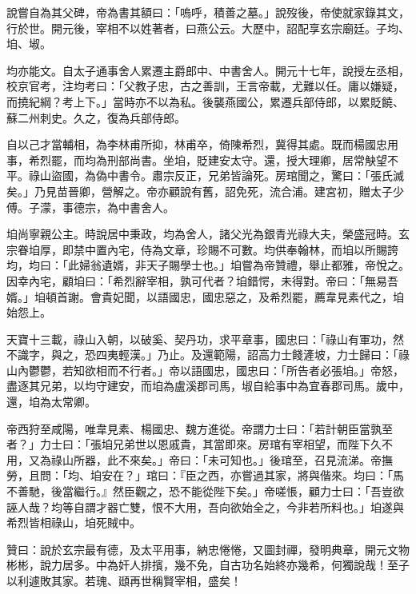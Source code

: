 \begin{pinyinscope}
 說嘗自為其父碑，帝為書其額曰：「嗚呼，積善之墓。」說歿後，帝使就家錄其文，行於世。開元後，宰相不以姓著者，曰燕公云。大歷中，詔配享玄宗廟廷。子均、垍、埱。



 均亦能文。自太子通事舍人累遷主爵郎中、中書舍人。開元十七年，說授左丞相，校京官考，注均考曰：「父教子忠，古之善訓，王言帝載，尤難以任。庸以嫌疑，而撓紀綱？考上下。」當時亦不以為私。後襲燕國公，累遷兵部侍郎，以累貶饒、蘇二州刺史。久之，復為兵部侍郎。



 自以己才當輔相，為李林甫所抑，林甫卒，倚陳希烈，冀得其處。既而楊國忠用事，希烈罷，而均為刑部尚書。坐垍，貶建安太守。還，授大理卿，居常觖望不平。祿山盜國，為偽中書令。肅宗反正，兄弟皆論死。房琯聞之，驚曰：「張氏滅矣。」乃見苗晉卿，營解之。帝亦顧說有舊，詔免死，流合浦。建宮初，贈太子少傅。子濛，事德宗，為中書舍人。



 垍尚寧親公主。時說居中秉政，均為舍人，諸父光為銀青光祿大夫，榮盛冠時。玄宗眷垍厚，即禁中置內宅，侍為文章，珍賜不可數。均供奉翰林，而垍以所賜誇均，均曰：「此婦翁遺婿，非天子賜學士也。」垍嘗為帝贊禮，舉止都雅，帝悅之。因幸內宅，顧垍曰：「希烈辭宰相，孰可代者？垍錯愕，未得對。帝曰：「無易吾婿。」垍頓首謝。會貴妃聞，以語國忠，國忠惡之，及希烈罷，薦韋見素代之，垍始怨上。



 天寶十三載，祿山入朝，以破奚、契丹功，求平章事，國忠曰：「祿山有軍功，然不識字，與之，恐四夷輕漢。」乃止。及還範陽，詔高力士餞滻坡，力士歸曰：「祿山內鬱鬱，若知欲相而不行者。」帝以語國忠，國忠曰：「所告者必張垍。」帝怒，盡逐其兄弟，以均守建安，而垍為盧溪郡司馬，埱自給事中為宜春郡司馬。歲中，還，垍為太常卿。



 帝西狩至咸陽，唯韋見素、楊國忠、魏方進從。帝謂力士曰：「若計朝臣當孰至者？」力士曰：「張垍兄弟世以恩戚貴，其當即來。房琯有宰相望，而陛下久不用，又為祿山所器，此不來矣。」帝曰：「未可知也。」後琯至，召見流涕。帝撫勞，且問：「均、垍安在？」琯曰：『臣之西，亦嘗過其家，將與偕來。均曰：「馬不善馳，後當繼行。』然臣觀之，恐不能從陛下矣。」帝嗟悵，顧力士曰：「吾豈欲誣人哉？均等自謂才器亡雙，恨不大用，吾向欲始全之，今非若所料也。」垍遂與希烈皆相祿山，垍死賊中。



 贊曰：說於玄宗最有德，及太平用事，納忠惓惓，又圖封禪，發明典章，開元文物彬彬，說力居多。中為奸人排擯，幾不免，自古功名始終亦幾希，何獨說哉！至子以利遽敗其家。若瑰、頲再世稱賢宰相，盛矣！



\end{pinyinscope}